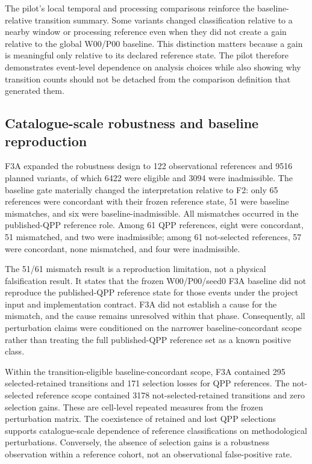\documentclass[11pt,a4paper]{article}
\begin{document}
The pilot's local temporal and processing comparisons reinforce the baseline-relative transition summary. Some variants changed classification relative to a nearby window or processing reference even when they did not create a gain relative to the global W00/P00 baseline. This distinction matters because a gain is meaningful only relative to its declared reference state. The pilot therefore demonstrates event-level dependence on analysis choices while also showing why transition counts should not be detached from the comparison definition that generated them.

\subsection{Catalogue-scale robustness and baseline reproduction}
F3A expanded the robustness design to 122 observational references and 9516 planned variants, of which 6422 were eligible and 3094 were inadmissible. The baseline gate materially changed the interpretation relative to F2: only 65 references were concordant with their frozen reference state, 51 were baseline mismatches, and six were baseline-inadmissible. All mismatches occurred in the published-QPP reference role. Among 61 QPP references, eight were concordant, 51 mismatched, and two were inadmissible; among 61 not-selected references, 57 were concordant, none mismatched, and four were inadmissible.

The 51/61 mismatch result is a reproduction limitation, not a physical falsification result. It states that the frozen W00/P00/seed0 F3A baseline did not reproduce the published-QPP reference state for those events under the project input and implementation contract. F3A did not establish a cause for the mismatch, and the cause remains unresolved within that phase. Consequently, all perturbation claims were conditioned on the narrower baseline-concordant scope rather than treating the full published-QPP reference set as a known positive class.

Within the transition-eligible baseline-concordant scope, F3A contained 295 selected-retained transitions and 171 selection losses for QPP references. The not-selected reference scope contained 3178 not-selected-retained transitions and zero selection gains. These are cell-level repeated measures from the frozen perturbation matrix. The coexistence of retained and lost QPP selections supports catalogue-scale dependence of reference classifications on methodological perturbations. Conversely, the absence of selection gains is a robustness observation within a reference cohort, not an observational false-positive rate.
\end{document}

